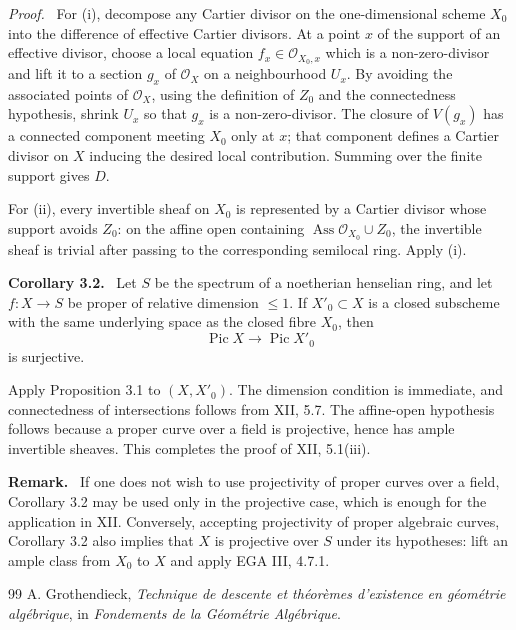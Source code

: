 \documentclass[12pt]{article}
\newcommand{\Oo}{\mathcal{O}}
\newcommand{\Ass}{\operatorname{Ass}}
\newcommand{\Pic}{\operatorname{Pic}}
\newenvironment{statement}[1]{\par\medskip\noindent\textbf{#1.}\ }{\par\medskip}
\newenvironment{remarktext}[1]{\par\medskip\noindent\textbf{#1.}\ }{\par\medskip}
\newenvironment{prooftext}[1][Proof]{\par\noindent\emph{#1.}\ }{\par\medskip}
\begin{document}
\begin{prooftext}
For (i), decompose any Cartier divisor on the one-dimensional scheme \(X_0\) into the difference of effective Cartier divisors. At a point \(x\) of the support of an effective divisor, choose a local equation \(f_x\in\Oo_{X_0,x}\) which is a non-zero-divisor and lift it to a section \(g_x\) of \(\Oo_X\) on a neighbourhood \(U_x\). By avoiding the associated points of \(\Oo_X\), using the definition of \(Z_0\) and the connectedness hypothesis, shrink \(U_x\) so that \(g_x\) is a non-zero-divisor. The closure of \(V(g_x)\) has a connected component meeting \(X_0\) only at \(x\); that component defines a Cartier divisor on \(X\) inducing the desired local contribution. Summing over the finite support gives \(D\).

For (ii), every invertible sheaf on \(X_0\) is represented by a Cartier divisor whose support avoids \(Z_0\): on the affine open containing \(\Ass\Oo_{X_0}\cup Z_0\), the invertible sheaf is trivial after passing to the corresponding semilocal ring. Apply (i).
\end{prooftext}

\begin{statement}{Corollary 3.2}
Let \(S\) be the spectrum of a noetherian henselian ring, and let \(f:X\to S\) be proper of relative dimension \(\le1\). If \(X'_0\subset X\) is a closed subscheme with the same underlying space as the closed fibre \(X_0\), then
\[
\Pic X\longrightarrow \Pic X'_0
\]
is surjective.
\end{statement}

Apply Proposition 3.1 to \((X,X'_0)\). The dimension condition is immediate, and connectedness of intersections follows from XII, 5.7. The affine-open hypothesis follows because a proper curve over a field is projective, hence has ample invertible sheaves. This completes the proof of XII, 5.1(iii).

\begin{remarktext}{Remark}
If one does not wish to use projectivity of proper curves over a field, Corollary 3.2 may be used only in the projective case, which is enough for the application in XII. Conversely, accepting projectivity of proper algebraic curves, Corollary 3.2 also implies that \(X\) is projective over \(S\) under its hypotheses: lift an ample class from \(X_0\) to \(X\) and apply EGA III, 4.7.1.
\end{remarktext}

\begin{thebibliography}{99}
 A. Grothendieck, \emph{Technique de descente et th\'eor\`emes d'existence en g\'eom\'etrie alg\'ebrique}, in \emph{Fondements de la G\'eom\'etrie Alg\'ebrique}.
\end{thebibliography}
\end{document}
